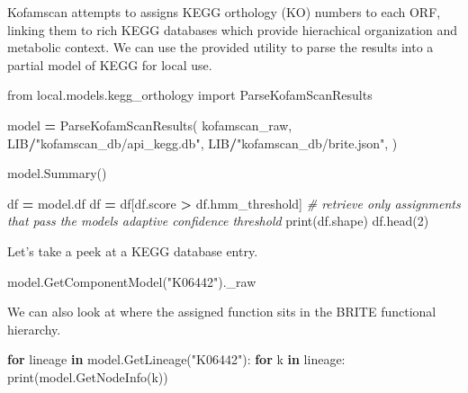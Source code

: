 \documentclass[
]{book}
\newenvironment{Shaded}{\begin{snugshade}}{\end{snugshade}}
\newcommand{\BuiltInTok}[1]{#1}
\newcommand{\CommentTok}[1]{\textcolor[rgb]{0.56,0.35,0.01}{\textit{#1}}}
\newcommand{\ControlFlowTok}[1]{\textcolor[rgb]{0.13,0.29,0.53}{\textbf{#1}}}
\newcommand{\DecValTok}[1]{\textcolor[rgb]{0.00,0.00,0.81}{#1}}
\newcommand{\ImportTok}[1]{#1}
\newcommand{\KeywordTok}[1]{\textcolor[rgb]{0.13,0.29,0.53}{\textbf{#1}}}
\newcommand{\NormalTok}[1]{#1}
\newcommand{\OperatorTok}[1]{\textcolor[rgb]{0.81,0.36,0.00}{\textbf{#1}}}
\newcommand{\StringTok}[1]{\textcolor[rgb]{0.31,0.60,0.02}{#1}}
\begin{document}
Kofamscan attempts to assigns KEGG orthology (KO) numbers to each ORF, linking them to rich KEGG databases
which provide hierachical organization and metabolic context. We can use the provided utility to parse the
results into a partial model of KEGG for local use.

\begin{Shaded}
\begin{Highlighting}[numbers=left,,]
\ImportTok{from}\NormalTok{ local.models.kegg\_orthology }\ImportTok{import}\NormalTok{ ParseKofamScanResults}

\NormalTok{model }\OperatorTok{=}\NormalTok{ ParseKofamScanResults(}
\NormalTok{    kofamscan\_raw,}
\NormalTok{    LIB}\OperatorTok{/}\StringTok{"kofamscan\_db/api\_kegg.db"}\NormalTok{,}
\NormalTok{    LIB}\OperatorTok{/}\StringTok{"kofamscan\_db/brite.json"}\NormalTok{,}
\NormalTok{)}
\end{Highlighting}
\end{Shaded}

\begin{Shaded}
\begin{Highlighting}[numbers=left,,]
\NormalTok{model.Summary()}
\end{Highlighting}
\end{Shaded}

\begin{Shaded}
\begin{Highlighting}[numbers=left,,]
\NormalTok{df }\OperatorTok{=}\NormalTok{ model.df}
\NormalTok{df }\OperatorTok{=}\NormalTok{ df[df.score }\OperatorTok{\textgreater{}}\NormalTok{ df.hmm\_threshold] }\CommentTok{\# retrieve only assignments that pass the model\textquotesingle{}s adaptive confidence threshold}
\BuiltInTok{print}\NormalTok{(df.shape)}
\NormalTok{df.head(}\DecValTok{2}\NormalTok{)}
\end{Highlighting}
\end{Shaded}

Let's take a peek at a KEGG database entry.

\begin{Shaded}
\begin{Highlighting}[numbers=left,,]
\NormalTok{model.GetComponentModel(}\StringTok{"K06442"}\NormalTok{).\_raw}
\end{Highlighting}
\end{Shaded}

We can also look at where the assigned function sits in the BRITE functional hierarchy.

\begin{Shaded}
\begin{Highlighting}[numbers=left,,]
\ControlFlowTok{for}\NormalTok{ lineage }\KeywordTok{in}\NormalTok{ model.GetLineage(}\StringTok{"K06442"}\NormalTok{):}
    \ControlFlowTok{for}\NormalTok{ k }\KeywordTok{in}\NormalTok{ lineage:}
        \BuiltInTok{print}\NormalTok{(model.GetNodeInfo(k))}
\end{Highlighting}
\end{Shaded}
\end{document}
